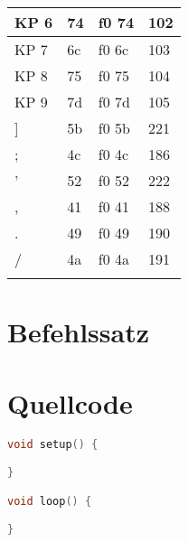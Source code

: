 \begin{longtable}{| p{} | p{} | p{} | p{} |}
  KP 6 & 74 & f0 74 & 102 \\ \hline
  KP 7 & 6c & f0 6c & 103 \\ \hline
  KP 8 & 75 & f0 75 & 104 \\ \hline
  KP 9 & 7d & f0 7d & 105 \\ \hline
  ] & 5b & f0 5b & 221 \\ \hline
  ; & 4c & f0 4c & 186 \\ \hline
  ' & 52 & f0 52 & 222 \\ \hline
  , & 41 & f0 41 & 188 \\ \hline
  . & 49 & f0 49 & 190 \\ \hline
  / & 4a & f0 4a & 191 \\
  \hline
  \label{scancode_set_2}
\end{longtable}


\section{Befehlssatz}


\section{Quellcode}
\begin{lstlisting}[language=C,caption={Arduino},captionpos=b,basicstyle=\small,frame=single,breaklines=true]
void setup() {

}

void loop() {

}
\end{lstlisting}